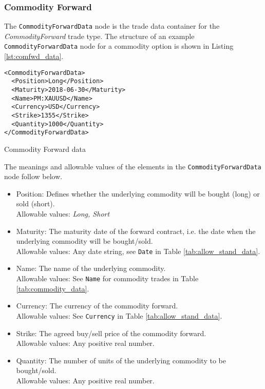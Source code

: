 \subsubsection{Commodity Forward}

The \lstinline!CommodityForwardData!  node is the trade data container for the  \emph{CommodityForward} trade type.   The structure of an example \lstinline!CommodityForwardData! node for a commodity option is shown in 
Listing \ref{lst:comfwd_data}.

\begin{listing}[H]
\begin{verbatim}
<CommodityForwardData>
  <Position>Long</Position>
  <Maturity>2018-06-30</Maturity>
  <Name>PM:XAUUSD</Name>
  <Currency>USD</Currency>
  <Strike>1355</Strike>
  <Quantity>1000</Quantity>
</CommodityForwardData>
\end{verbatim}
\caption{Commodity Forward data}
\label{lst:comfwd_data}
\end{listing}

The meanings and allowable values of the elements in the \lstinline!CommodityForwardData!  node follow below.

\begin{itemize}
	\item Position: Defines whether the underlying commodity will be bought (long) or sold (short). \\
	Allowable values: \emph{Long, Short}
	\item Maturity: The maturity date of the forward contract, i.e. the date when the underlying commodity will be bought/sold. \\
	Allowable values: Any date string, see \lstinline!Date! in Table \ref{tab:allow_stand_data}.
	\item Name: The name of the underlying commodity. \\
	Allowable values:  See \lstinline!Name! for commodity trades in Table \ref{tab:commodity_data}. \\
	\item Currency: The  currency of the commodity forward. \\
	Allowable values:  See \lstinline!Currency! in Table \ref{tab:allow_stand_data}.	
	\item Strike: The agreed buy/sell price of the commodity forward. \\
	Allowable values:  Any positive real number.	
	\item Quantity: The number of units of the underlying commodity to be bought/sold. \\
	Allowable values:  Any positive real number.
\end{itemize}
